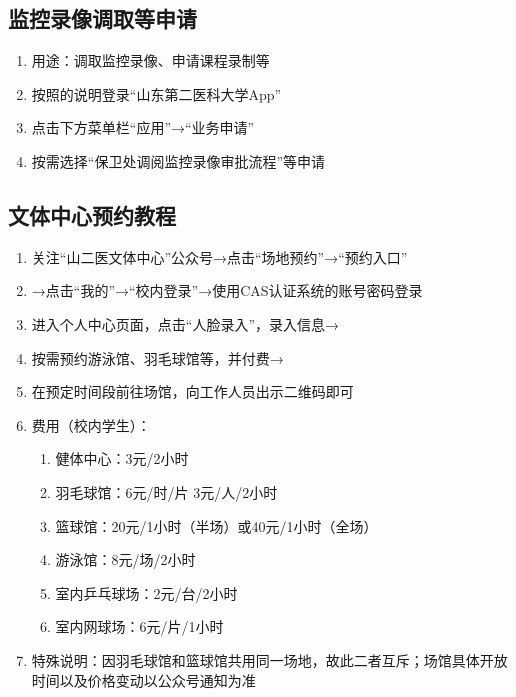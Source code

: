 \subsection[监控录像调取等申请]{监控录像调取等申请}
\label{sdsmu_app}
\begin{enumerate}
    \item 用途：调取监控录像、申请课程录制等
    \item 按照的说明登录“山东第二医科大学App”
    \item 点击下方菜单栏“应用”→“业务申请”
    \item 按需选择“保卫处调阅监控录像审批流程”等申请
\end{enumerate}

\subsection[文体中心预约教程]{文体中心预约教程}
\label{sports_center_book}
\begin{enumerate}
    \item 关注“山二医文体中心”公众号→点击“场地预约”→“预约入口”
    \item →点击“我的”→“校内登录”→使用CAS认证系统的账号密码登录
    \item 进入个人中心页面，点击“人脸录入”，录入信息→
    \item 按需预约游泳馆、羽毛球馆等，并付费→
    \item 在预定时间段\footnotemark 前往场馆，向工作人员出示二维码即可
    \item 费用（校内学生）：
          \begin{enumerate}
              \item 健体中心：3元/2小时
              \item 羽毛球馆\footnotemark：6元/时/片 3元/人/2小时
              \item 篮球馆：20元/1小时（半场）或40元/1小时（全场）
              \item 游泳馆\footnotemark：8元/场/2小时
              \item 室内乒乓球场：2元/台/2小时
              \item 室内网球场：6元/片/1小时
          \end{enumerate}
    \item 特殊说明：因羽毛球馆和篮球馆共用同一场地，故此二者互斥；场馆具体开放时间以及价格变动以公众号通知为准
\end{enumerate}

